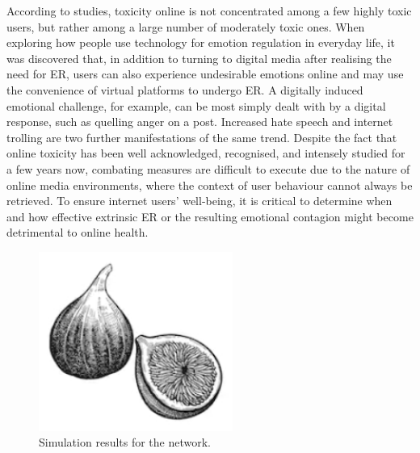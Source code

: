 \documentclass[lettersize,journal]{IEEEtran}
\begin{document}
According to studies, toxicity online is not concentrated among a few highly toxic users, but rather among a large number of moderately toxic ones. When exploring how people use technology for emotion regulation in everyday life, it was discovered that, in addition to turning to digital media after realising the need for ER, users can also experience undesirable emotions online and may use the convenience of virtual platforms to undergo ER. A digitally induced emotional challenge, for example, can be most simply dealt with by a digital response, such as quelling anger on a post. Increased hate speech and internet trolling are two further manifestations of the same trend. Despite the fact that online toxicity has been well acknowledged, recognised, and intensely studied for a few years now, combating measures are difficult to execute due to the nature of online media environments, where the context of user behaviour cannot always be retrieved. To ensure internet users' well-being, it is critical to determine when and how effective extrinsic ER or the resulting emotional contagion might become detrimental to online health.
\begin{figure}[!t]
\centering
\includegraphics[width=2.5in]{fig1}
\caption{Simulation results for the network.}
\label{fig_1}
\end{figure}
\end{document}
